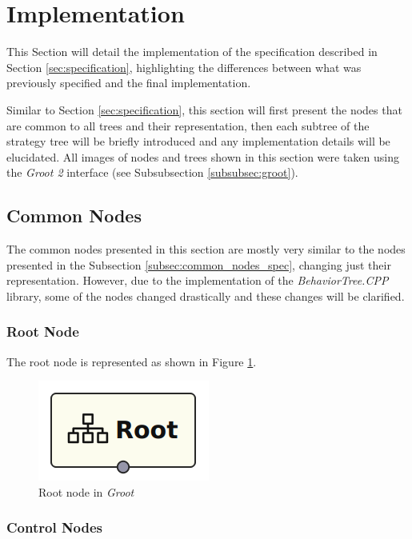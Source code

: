 \section{Implementation}
\label{sec:implementation}

This Section will detail the implementation of the specification described in Section \ref{sec:specification}, highlighting the differences between what was previously specified and the final implementation.

Similar to Section \ref{sec:specification}, this section will first present the nodes that are common to all trees and their representation, then each subtree of the strategy tree will be briefly introduced and any implementation details will be elucidated. All images of nodes and trees shown in this section were taken using the \textit{Groot 2} interface (see Subsubsection \ref{subsubsec:groot}).

\subsection{Common Nodes}
\label{subsec:common_nodes_impl}

The common nodes presented in this section are mostly very similar to the nodes presented in the Subsection \ref{subsec:common_nodes_spec}, changing just their representation. However, due to the implementation of the \textit{BehaviorTree.CPP} library, some of the nodes changed drastically and these changes will be clarified.

\subsubsection{Root Node}

The root node is represented as shown in Figure \ref{fig:root_node_impl}.

\begin{figure}[!h]
    \centering
    \includegraphics[width=0.15\linewidth]{images/implementation/RootNode.png}
    \caption{Root node in \textit{Groot}}
    \label{fig:root_node_impl}
\end{figure}

\subsubsection{Control Nodes}

